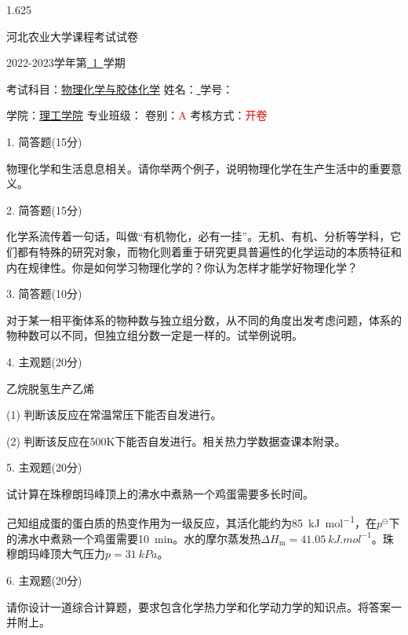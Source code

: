 \documentclass[12pt, b5paper]{article}
\newcommand*{\cred}{\textcolor{red}}
\begin{document}
\begin{spacing}{1.625}

\centerline{{\huge 河北农业大学课程考试试卷}}

\centerline{\large 2022-2023学年第\underline{\ 1\ }学期}

考试科目：\underline{物理化学与胶体化学} \quad 姓名：\underline{ \qquad \qquad} \quad 学号：\underline{ \qquad \qquad \qquad}

学院：\underline{理工学院} \quad 专业班级：\underline{\qquad \qquad \qquad \qquad} \quad 卷别：\cred{A} 考核方式：\cred{开卷}

\bigskip


1. 简答题(15分)

物理化学和生活息息相关。请你举两个例子，说明物理化学在生产生活中的重要意义。

\bigskip

\bigskip

2. 简答题(15分)

化学系流传着一句话，叫做“有机物化，必有一挂”。无机、有机、分析等学科，它们都有特殊的研究对象，而物化则着重于研究更具普遍性的化学运动的本质特征和内在规律性。你是如何学习物理化学的？你认为怎样才能学好物理化学？

\bigskip

\bigskip

3. 简答题(10分)

对于某一相平衡体系的物种数与独立组分数，从不同的角度出发考虑问题，体系的物种数可以不同，但独立组分数一定是一样的。试举例说明。

\bigskip

\bigskip

4. 主观题(20分)

乙烷脱氢生产乙烯 

(1) 判断该反应在常温常压下能否自发进行。

(2) 判断该反应在500K下能否自发进行。相关热力学数据查课本附录。

\bigskip

\bigskip


5. 主观题(20分)

试计算在珠穆朗玛峰顶上的沸水中煮熟一个鸡蛋需要多长时间。

己知组成蛋的蛋白质的热变作用为一级反应，其活化能约为\SI{85}{kJ.mol^{-1}}，在$p^\ominus$下的沸水中煮熟一个鸡蛋需要\SI{10}{min}。水的摩尔蒸发热$\Delta H_\mathrm{m} = \SI{41.05}{kJ.mol^{-1}}$。珠穆朗玛峰顶大气压力$p=\SI{31}{kPa}$。

\bigskip

\bigskip

6. 主观题(20分)

请你设计一道综合计算题，要求包含化学热力学和化学动力学的知识点。将答案一并附上。


\end{spacing}
\end{document}
